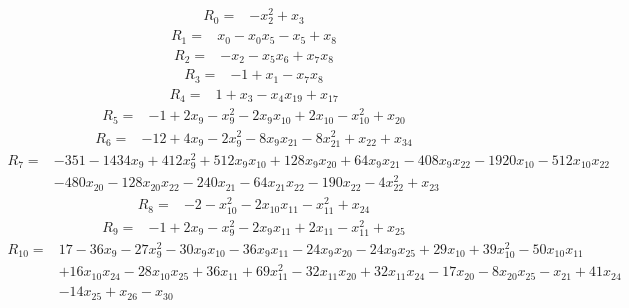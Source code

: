 \begin{align*}
R_{0}={}&-x_{2}^{2}+x_{3}
\end{align*}
\begin{align*}
R_{1}={}&x_{0}-x_{0}x_{5}-x_{5}+x_{8}
\end{align*}
\begin{align*}
R_{2}={}&-x_{2}-x_{5}x_{6}+x_{7}x_{8}
\end{align*}
\begin{align*}
R_{3}={}&-1+x_{1}-x_{7}x_{8}
\end{align*}
\begin{align*}
R_{4}={}&1+x_{3}-x_{4}x_{19}+x_{17}
\end{align*}
\begin{align*}
R_{5}={}&-1+2x_{9}-x_{9}^{2}-2x_{9}x_{10}+2x_{10}-x_{10}^{2}+x_{20}
\end{align*}
\begin{align*}
R_{6}={}&-12+4x_{9}-2x_{9}^{2}-8x_{9}x_{21}-8x_{21}^{2}+x_{22}+x_{34}
\end{align*}
\begin{align*}
R_{7}={}&-351-1434x_{9}+412x_{9}^{2}+512x_{9}x_{10}+128x_{9}x_{20}+64x_{9}x_{21}-408x_{9}x_{22}-1920x_{10}-512x_{10}x_{22}\\
{}&-480x_{20}-128x_{20}x_{22}-240x_{21}-64x_{21}x_{22}-190x_{22}-4x_{22}^{2}+x_{23}
\end{align*}
\begin{align*}
R_{8}={}&-2-x_{10}^{2}-2x_{10}x_{11}-x_{11}^{2}+x_{24}
\end{align*}
\begin{align*}
R_{9}={}&-1+2x_{9}-x_{9}^{2}-2x_{9}x_{11}+2x_{11}-x_{11}^{2}+x_{25}
\end{align*}
\begin{align*}
R_{10}={}&17-36x_{9}-27x_{9}^{2}-30x_{9}x_{10}-36x_{9}x_{11}-24x_{9}x_{20}-24x_{9}x_{25}+29x_{10}+39x_{10}^{2}-50x_{10}x_{11}\\
{}&+16x_{10}x_{24}-28x_{10}x_{25}+36x_{11}+69x_{11}^{2}-32x_{11}x_{20}+32x_{11}x_{24}-17x_{20}-8x_{20}x_{25}-x_{21}+41x_{24}\\
{}&-14x_{25}+x_{26}-x_{30}
\end{align*}
